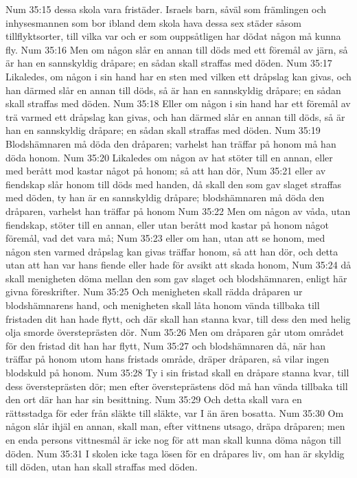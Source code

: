 Num 35:15  dessa skola vara fristäder. Israels barn, såväl som främlingen och inhysesmannen som bor ibland dem skola hava dessa sex städer såsom tillflyktsorter, till vilka var och er som ouppsåtligen har dödat någon må kunna fly.
Num 35:16  Men om någon slår en annan till döds med ett föremål av järn, så är han en sannskyldig dråpare; en sådan skall straffas med döden.
Num 35:17  Likaledes, om någon i sin hand har en sten med vilken ett dråpslag kan givas, och han därmed slår en annan till döds, så är han en sannskyldig dråpare; en sådan skall straffas med döden.
Num 35:18  Eller om någon i sin hand har ett föremål av trä varmed ett dråpslag kan givas, och han därmed slår en annan till döds, så är han en sannskyldig dråpare; en sådan skall straffas med döden.
Num 35:19  Blodshämnaren må döda den dråparen; varhelst han träffar på honom må han döda honom.
Num 35:20  Likaledes om någon av hat stöter till en annan, eller med berått mod kastar något på honom; så att han dör,
Num 35:21  eller av fiendskap slår honom till döds med handen, då skall den som gav slaget straffas med döden, ty han är en sannskyldig dråpare; blodshämnaren må döda den dråparen, varhelst han träffar på honom
Num 35:22  Men om någon av våda, utan fiendskap, stöter till en annan, eller utan berått mod kastar på honom något föremål, vad det vara må;
Num 35:23  eller om han, utan att se honom, med någon sten varmed dråpslag kan givas träffar honom, så att han dör, och detta utan att han var hans fiende eller hade för avsikt att skada honom,
Num 35:24  då skall menigheten döma mellan den som gav slaget och blodshämnaren, enligt här givna föreskrifter.
Num 35:25  Och menigheten skall rädda dråparen ur blodshämnarens hand, och menigheten skall låta honom vända tillbaka till fristaden dit han hade flytt, och där skall han stanna kvar, till dess den med helig olja smorde översteprästen dör.
Num 35:26  Men om dråparen går utom området för den fristad dit han har flytt,
Num 35:27  och blodshämnaren då, när han träffar på honom utom hans fristads område, dräper dråparen, så vilar ingen blodskuld på honom.
Num 35:28  Ty i sin fristad skall en dråpare stanna kvar, till dess översteprästen dör; men efter översteprästens död må han vända tillbaka till den ort där han har sin besittning.
Num 35:29  Och detta skall vara en rättsstadga för eder från släkte till släkte, var I än ären bosatta.
Num 35:30  Om någon slår ihjäl en annan, skall man, efter vittnens utsago, dräpa dråparen; men en enda persons vittnesmål är icke nog för att man skall kunna döma någon till döden.
Num 35:31  I skolen icke taga lösen för en dråpares liv, om han är skyldig till döden, utan han skall straffas med döden.
